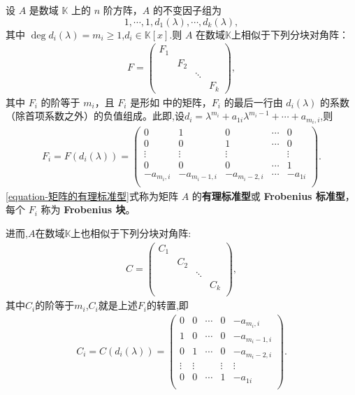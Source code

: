 \documentclass[../../main.tex]{subfiles}%
\begin{document}
\begin{theorem}\label{theorem:有理标准型核心定理}
设 $A$ 是数域 $\mathbb{K}$ 上的 $n$ 阶方阵，$A$ 的不变因子组为
\[
1,\cdots,1,d_1(\lambda),\cdots,d_k(\lambda),
\]
其中 $\deg d_i(\lambda)=m_i\geqslant 1$,$d_i\in \mathbb{K}[x]$.则 $A$ 在数域$\mathbb{K}$上相似于下列分块对角阵：
\begin{align}\label{equation-矩阵的有理标准型}
F = \begin{pmatrix}
F_1 & & & \\
& F_2 & & \\
& & \ddots & \\
& & & F_k
\end{pmatrix},
\end{align}
其中 $F_i$ 的阶等于 $m_i$，且 $F_i$ 是形如 中的矩阵，$F_i$ 的最后一行由 $d_i(\lambda)$ 的系数（除首项系数之外）的负值组成。此即,设$d_i=\lambda ^{m_i}+a_{1i}\lambda ^{m_i-1}+\cdots +a_{m_i,i}$,则
\begin{align*}
F_i=F(d_i(\lambda))=\left( \begin{matrix}
0&		1&		0&		\cdots&		0\\
0&		0&		1&		\cdots&		0\\
\vdots&		\vdots&		\vdots&		&		\vdots\\
0&		0&		0&		\cdots&		1\\
-a_{m_i,i}&		-a_{m_i-1,i}&		-a_{m_i-2,i}&		\cdots&		-a_{1i}\\
\end{matrix} \right) .
\end{align*}
\eqref{equation-矩阵的有理标准型}式称为矩阵 $A$ 的\textbf{有理标准型}或 \textbf{Frobenius 标准型}，每个 $F_i$ 称为 \textbf{Frobenius 块}。

进而,$A$在数域$\mathbb{K}$上也相似于下列分块对角阵:
\begin{align*}
C=\left( \begin{matrix}
C_1&		&		&		\\
&		C_2&		&		\\
&		&		\ddots&		\\
&		&		&		C_k\\
\end{matrix} \right) ,
\end{align*}
其中$C_i$的阶等于$m_i$,$C_i$就是上述$F_i$的转置,即
\begin{align*}
C_i=C(d_i(\lambda ))=\left( \begin{matrix}
0&		0&		\cdots&		0&		-a_{m_i,i}\\
1&		0&		\cdots&		0&		-a_{m_i-1,i}\\
0&		1&		\cdots&		0&		-a_{m_i-2,i}\\
\vdots&		\vdots&		&		\vdots&		\vdots\\
0&		0&		\cdots&		1&		-a_{1i}\\
\end{matrix} \right) .
\end{align*}
\end{theorem}
\end{document}
